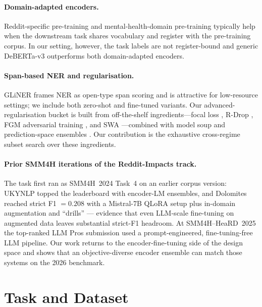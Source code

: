 \documentclass[11pt]{article}
\begin{document}
\paragraph{Domain-adapted encoders.}
Reddit-specific pre-training \citep{guo2023socbert} and mental-health-domain
pre-training \citep{stressroberta2022} typically help when the downstream
task shares vocabulary and register with the pre-training corpus. In our
setting, however, the task labels are not register-bound and generic
DeBERTa-v3 \citep{he2023debertav3} outperforms both domain-adapted encoders.

\paragraph{Span-based NER and regularisation.}
GLiNER \citep{zaratiana2024gliner} frames NER as open-type span
scoring and is attractive for low-resource settings; we include both
zero-shot and fine-tuned variants. Our advanced-regularisation bucket
is built from off-the-shelf ingredients---focal loss
\citep{lin2017focal}, R-Drop \citep{liang2021rdrop}, FGM adversarial
training \citep{miyato2017adversarial}, and SWA
\citep{izmailov2018swa}---combined with model soup
\citep{wortsman2022modelsoup} and prediction-space ensembles
\citep{kuncheva2003measures}. Our contribution is the exhaustive
cross-regime subset search over these ingredients.

\paragraph{Prior SMM4H iterations of the Reddit-Impacts track.}
The task first ran as SMM4H~2024 Task~4 on an earlier corpus version:
UKYNLP \citep{obeidat2024ukynlp} topped the leaderboard with
encoder-LM ensembles, and Dolomites \citep{tortoreto2024dolomites}
reached strict F1 $=0.208$ with a Mistral-7B QLoRA setup plus
in-domain augmentation and ``drills'' --- evidence that even
LLM-scale fine-tuning on augmented data leaves substantial strict-F1
headroom. At SMM4H--HeaRD~2025 \citep{klein2025overview} the
top-ranked LLM Pros submission \citep{pradhan2025llmpros} used a
prompt-engineered, fine-tuning-free LLM pipeline. Our work returns to
the encoder-fine-tuning side of the design space and shows that an
objective-diverse encoder ensemble can match those systems on the
2026 benchmark.

\section{Task and Dataset}
\label{sec:data}
\end{document}
